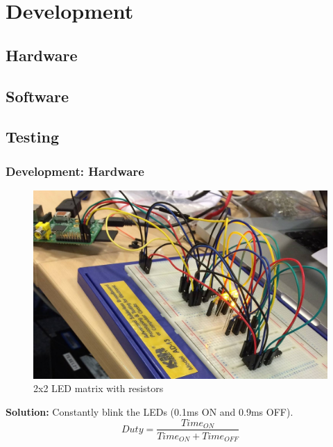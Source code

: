 \documentclass{beamer}
\begin{document}


\section{Development}
\subsection{Hardware}
\subsection{Software}
\subsection{Testing}

\begin{frame}
\frametitle{Development: Hardware}

\begin{figure}
	\includegraphics[scale=0.12]{images/matrix_with_resistors.jpg}
	\caption{2x2 LED matrix with resistors}
\end{figure}

\textbf{Solution:} Constantly blink the LEDs (0.1ms ON and 0.9ms OFF).
$$Duty = \frac{Time_{ON}}{Time_{ON} + Time_{OFF}}$$

\end{frame}
\end{document}
